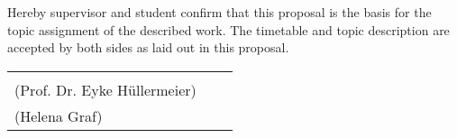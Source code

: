\documentclass[12pt]{scrartcl}
\begin{document}
\newpage
\printbibliography

\newpage
Hereby supervisor and student confirm that this proposal is the basis for the topic assignment of the described work. The timetable and topic description are accepted by both sides as laid out in this proposal.

\vspace{6cm}

\begin{center}
     \begin{tabular}{l p{} r}
       \cline{1-1} \cline{3-3}
       \begin{minipage}[t]{0.4\textwidth}
         \centering
         Supervisor\\(Prof. Dr. Eyke H\"ullermeier)
         \end{minipage}
&
         \begin{minipage}[t]{0.2\textwidth}
         \end{minipage}
&
         \begin{minipage}[t]{0.4\textwidth}
           \centering
           Student\\(Helena Graf)
         \end{minipage}
     \end{tabular}
\end{center}
\end{document}
